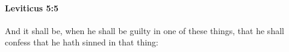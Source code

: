 
		\paragraph{Leviticus 5:5} %
			\label{LEVITICUS-5-5}

			And it shall be, when he shall be guilty in one of these things, that he shall confess that he hath sinned in that thing:


